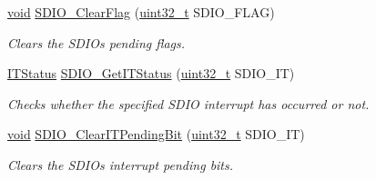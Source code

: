 \begin{DoxyCompactItemize}
\hyperlink{usb__devapi_8h_afabf60e7f57651d6d595a02c75f07cd0}{void} \hyperlink{group___s_d_i_o___exported___functions_ga7aff4efdeb528229135f9f285e53518a}{S\+D\+I\+O\+\_\+\+Clear\+Flag} (\hyperlink{_p_e___types_8h_a33594304e786b158f3fb30289278f5af}{uint32\+\_\+t} S\+D\+I\+O\+\_\+\+F\+L\+AG)
\begin{DoxyCompactList}\small\item\em Clears the S\+D\+IO\textquotesingle{}s pending flags. \end{DoxyCompactList}\item 
\hyperlink{agilefox_2library_2inc_2stm32f10x__type_8h_aacbd7ed539db0aacd973a0f6eca34074}{I\+T\+Status} \hyperlink{group___s_d_i_o___exported___functions_ga2d64af1f3df0f99cb518f9a89bbd02ac}{S\+D\+I\+O\+\_\+\+Get\+I\+T\+Status} (\hyperlink{_p_e___types_8h_a33594304e786b158f3fb30289278f5af}{uint32\+\_\+t} S\+D\+I\+O\+\_\+\+IT)
\begin{DoxyCompactList}\small\item\em Checks whether the specified S\+D\+IO interrupt has occurred or not. \end{DoxyCompactList}\item 
\hyperlink{usb__devapi_8h_afabf60e7f57651d6d595a02c75f07cd0}{void} \hyperlink{group___s_d_i_o___exported___functions_ga048e07fd86321cd01b2a22c071c3149b}{S\+D\+I\+O\+\_\+\+Clear\+I\+T\+Pending\+Bit} (\hyperlink{_p_e___types_8h_a33594304e786b158f3fb30289278f5af}{uint32\+\_\+t} S\+D\+I\+O\+\_\+\+IT)
\begin{DoxyCompactList}\small\item\em Clears the S\+D\+IO\textquotesingle{}s interrupt pending bits. \end{DoxyCompactList}\end{DoxyCompactItemize}
